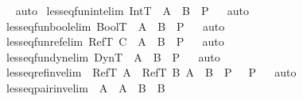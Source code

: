\begin{isabellebody}
\ \endisadelimproof
\isatagproof
{}\isamarkupfalse \ auto\endisatagproof
{\isafoldproof}\isadelimproof
\endisadelimproof
\isanewline
{}\isamarkupfalse \ lesseq{\isacharunderscore}fun{\isacharunderscore}int{\isacharbrackleft}elim{\isacharbang}{\isacharbrackright}{\isacharcolon}\ {\isachardoublequoteopen}IntT\ {\isasymsqsubseteq}\ A\ {\isasymrightarrow}\ B\ {\isasymLongrightarrow}\ P{\isachardoublequoteclose}\isadelimproof
\ \endisadelimproof
\isatagproof
{}\isamarkupfalse \ auto\endisatagproof
{\isafoldproof}\isadelimproof
\endisadelimproof
\isanewline
{}\isamarkupfalse \ lesseq{\isacharunderscore}fun{\isacharunderscore}bool{\isacharbrackleft}elim{\isacharbang}{\isacharbrackright}{\isacharcolon}\ {\isachardoublequoteopen}BoolT\ {\isasymsqsubseteq}\ A\ {\isasymrightarrow}\ B\ {\isasymLongrightarrow}\ P{\isachardoublequoteclose}\isadelimproof
\ \endisadelimproof
\isatagproof
{}\isamarkupfalse \ auto\endisatagproof
{\isafoldproof}\isadelimproof
\endisadelimproof
\isanewline
{}\isamarkupfalse \ lesseq{\isacharunderscore}fun{\isacharunderscore}ref{\isacharbrackleft}elim{\isacharbang}{\isacharbrackright}{\isacharcolon}\ {\isachardoublequoteopen}RefT\ C\ {\isasymsqsubseteq}\ A\ {\isasymrightarrow}\ B\ {\isasymLongrightarrow}\ P{\isachardoublequoteclose}\isadelimproof
\ \endisadelimproof
\isatagproof
{}\isamarkupfalse \ auto\endisatagproof
{\isafoldproof}\isadelimproof
\endisadelimproof
\isanewline
{}\isamarkupfalse \ lesseq{\isacharunderscore}fun{\isacharunderscore}dyn{\isacharbrackleft}elim{\isacharbang}{\isacharbrackright}{\isacharcolon}\ {\isachardoublequoteopen}DynT\ {\isasymsqsubseteq}\ A\ {\isasymrightarrow}\ B\ {\isasymLongrightarrow}\ P{\isachardoublequoteclose}\isadelimproof
\ \endisadelimproof
\isatagproof
{}\isamarkupfalse \ auto\endisatagproof
{\isafoldproof}\isadelimproof
\endisadelimproof
\isanewline
\isanewline
{}\isamarkupfalse \ lesseq{\isacharunderscore}ref{\isacharunderscore}inv{\isacharbrackleft}elim{\isacharbang}{\isacharbrackright}{\isacharcolon}\ {\isachardoublequoteopen}{\isasymlbrakk}\ RefT\ A\ {\isasymsqsubseteq}\ RefT\ B{\isacharsemicolon}\ A\ {\isasymsqsubseteq}\ B\ {\isasymLongrightarrow}\ P\ {\isasymrbrakk}\ {\isasymLongrightarrow}\ P{\isachardoublequoteclose}\isadelimproof
\ \endisadelimproof
\isatagproof
{}\isamarkupfalse \ auto\endisatagproof
{\isafoldproof}\isadelimproof
\endisadelimproof
\isanewline
{}\isamarkupfalse \ lesseq{\isacharunderscore}pair{\isacharunderscore}inv{\isacharbrackleft}elim{\isacharbang}{\isacharbrackright}{\isacharcolon}\ {\isachardoublequoteopen}{\isasymlbrakk}\ {\isacharparenleft}A{}\ {\isasymtimes}\ A{}{\isacharparenright}\ {\isasymsqsubseteq}\ {\isacharparenleft}B{}\ {\isasymtimes}\ B{}{\isacharparenright}{\isacharsemicolon}\isanewline

\end{isabellebody}

